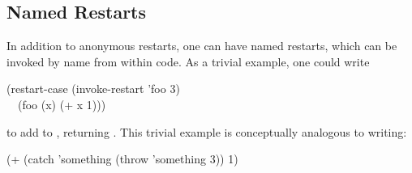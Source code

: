 \subsection{Named Restarts}

In addition to anonymous restarts, one can have named restarts, which can be invoked
by name from within code.  As a trivial example, one could write
\begin{lisp}
(restart-case (invoke-restart 'foo 3) \\
~~(foo (x) (+ x 1)))
\end{lisp}
to add  to , returning . This trivial example is conceptually analogous to 
writing:
\begin{lisp}
(+ (catch 'something (throw 'something 3)) 1)
\end{lisp}

